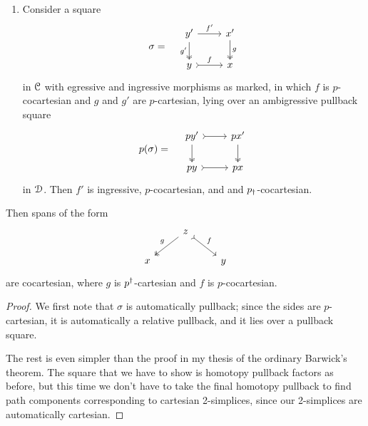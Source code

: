 \documentclass[main.tex]{subfiles}
\begin{document}
\begin{theorem}
\begin{enumerate}
    \item Consider a square
      \begin{equation*}
          \sigma = \quad
          \begin{tikzcd}
            y'
            \arrow[r, "f'"]
            \arrow[d, two heads, swap, "g'"]
            & x'
            \arrow[d, two heads, "g"]
            \\
            y
            \arrow[r, rightarrowtail, "f"]
            & x
          \end{tikzcd}
      \end{equation*}
      in $\mathcal{C}$ with egressive and ingressive morphisms as marked, in which $f$ is $p$-cocartesian and $g$ and $g'$ are $p$-cartesian, lying over an ambigressive pullback square
      \begin{equation*}
        p(\sigma) = \quad
        \begin{tikzcd}
          py'
          \arrow[r, rightarrowtail]
          \arrow[d, two heads]
          & px'
          \arrow[d, two heads]
          \\
          py
          \arrow[r, rightarrowtail]
          & px
        \end{tikzcd}
      \end{equation*}
      in $\mathcal{D}$. Then  $f'$ is ingressive, $p$-cocartesian, and and $p_{\dagger}$-cocartesian.
  \end{enumerate}
  Then spans of the form
  \begin{equation*}
    \begin{tikzcd}
      & z
      \arrow[dl, two heads, swap, "g"]
      \arrow[dr, rightarrowtail, "f"]
      \\
      x
      && y
    \end{tikzcd}
  \end{equation*}
  are cocartesian, where $g$ is $p^{\dagger}$-cartesian and $f$ is $p$-cocartesian.
\end{theorem}
\begin{proof}
  We first note that $\sigma$ is automatically pullback; since the sides are $p$-cartesian, it is automatically a relative pullback, and it lies over a pullback square.

  The rest is even simpler than the proof in my thesis of the ordinary Barwick's theorem. The square that we have to show is homotopy pullback factors as before, but this time we don't have to take the final homotopy pullback to find path components corresponding to cartesian 2-simplices, since our 2-simplices are automatically cartesian.
\end{proof}
\end{document}
